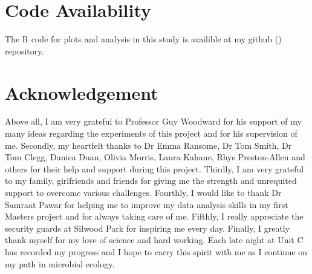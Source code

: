 \documentclass[11pt, a4paper]{article}
\begin{document}
\begin{spacing}{1.5}
\section*{Code Availability}

The R code for plots and analysis in this study is availible at my github (\href{https://github.com/ChuxuanJi/EECSummerProject}{}) repository.

\section*{Acknowledgement}

Above all, I am very grateful to Professor Guy Woodward for his support of my many ideas regarding the experiments of this project and for his supervision of me. Secondly, my heartfelt thanks to Dr Emma Ransome, Dr Tom Smith, Dr Tom Clegg, Danica Duan, Olivia Morris, Laura Kahane, Rhys Preston-Allen and others for their help and support during this project. Thirdly, I am very grateful to my family, girlfriends and friends for giving me the strength and unrequited support to overcome various challenges. Fourthly, I would like to thank Dr Samraat Pawar for helping me to improve my data analysis skills in my first Masters project and for always taking care of me. Fifthly, I really appreciate the security guards at Silwood Park for inspiring me every day. Finally, I greatly thank myself for my love of science and hard working. Each late night at Unit C has recorded my progress and I hope to carry this spirit with me as I continue on my path in microbial ecology.



\clearpage



\end{spacing}
\end{document}
